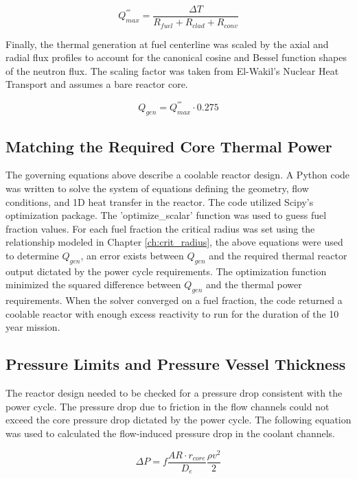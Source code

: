 \begin{equation}
    Q^{'''}_{max} = \frac{\Delta T}{R_{fuel} + R_{clad} + R_{conv}}
\end{equation}

Finally, the thermal generation at fuel centerline was scaled by the axial and
radial flux profiles to account for the canonical cosine and Bessel function
shapes of the neutron flux. The scaling factor was taken from
El-Wakil's Nuclear Heat Transport \citep{heat_trans_wakil} and assumes a 
bare reactor core.

\begin{equation}
    Q_{gen} = Q^{'''}_{max} \cdot 0.275
\end{equation}

\subsection{Matching the Required Core Thermal Power}
The governing equations above describe a coolable
reactor design. A Python code was written to solve the system of equations
defining the geometry, flow conditions, and 1D heat transfer in the reactor. The
code utilized Scipy's optimization package. The 'optimize\_scalar' function was
used to guess fuel fraction values. For each fuel fraction the critical radius
was set using the relationship modeled in Chapter \ref{ch:crit_radius}, the above equations
were used to determine $Q_{gen}$, an error exists between $Q_{gen}$ and the
required thermal reactor output dictated by the power cycle requirements. The
optimization function minimized the squared difference between $Q_{gen}$ and the
thermal power requirements. When the solver converged on a fuel fraction, the
code returned a coolable reactor with enough excess reactivity to run for the
duration of the 10 year mission.

\subsection{Pressure Limits and Pressure Vessel Thickness}
The reactor design needed to be checked for a pressure drop consistent with the
power cycle. The pressure drop due to friction in the flow channels could not
exceed the core pressure drop dictated by the power cycle. The following
equation was used to calculated the flow-induced pressure drop in the coolant
channels.

\begin{equation}
    \Delta P = f \frac{AR\cdot r_{core}}{D_e} \frac{\rho v^2}{2}
\end{equation}

